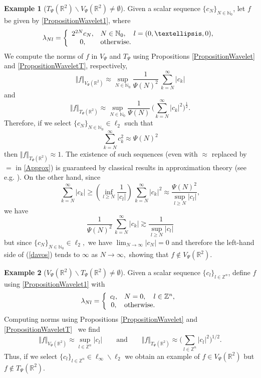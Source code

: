 \documentclass[11pt, a4paper,leqno]{amsart}
\theoremstyle{plain}
\numberwithin{equation}{section}
\theoremstyle{definition}
\newtheorem{example}{Example}
\theoremstyle{remark}
\begin{document}
\begin{example}[$T_{\Psi}(\mathbb{R}^{2})\backslash V_{\Psi}(\mathbb{R}%
^{2})\neq\emptyset$]
\label{Section5.1} Given a scalar sequence $\{c_{N}\}_{N\in\mathbb{N}_{0}}$,
let $f$ be given by \eqref{PropositionWavelet1}, where
\[
\lambda_{N l}=\left\{
\begin{array}
[c]{cl}%
2^{2N}c_{N}, & N\in\mathbb{N}_{0},\quad l=(0,\ldots,0),\\
0, & \text{otherwise}.
\end{array}
\right.
\]
We compute the norms of $f$ in $V_{\Psi}$ and $T_{\Psi}$ using Propositions
\ref{PropositionWavelet} and \ref{PropositionWaveletT}, respectively,
\[
\Vert f\Vert_{V_{\Psi}(\mathbb{R}^{2})}\approx\sup_{N\in\mathbb{N}_{0}}%
\frac{1}{\Psi(N)^{2}}\,\sum_{k=N}^{\infty}|c_{k}|
\]
and
\[
\Vert f\Vert_{T_{\Psi}(\mathbb{R}^{2})}\approx\sup_{N\in\mathbb{N}_{0}}%
\frac{1}{\Psi(N)}\,\bigg(\sum_{k=N}^{\infty}|c_{k}|^{2}\bigg)^{\frac{1}{2}}.
\]
Therefore, if we select $\{c_{N}\}_{N\in\mathbb{N}_{0}}\in\ell_{2}$ such
that
\begin{equation}
\sum_{k=N}^{\infty}c_{k}^{2}\approx\Psi(N)^{2} \label{Approx}%
\end{equation}
then $\Vert f\Vert_{T_{\Psi}(\mathbb{R}^{2})}\approx1.$ The existence of such
sequences (even with $\approx$ replaced by $=$ in \eqref{Approx}) is
guaranteed by classical results in approximation theory (see e.g. \cite[Section 2.5]{Timan}). On the other hand, since
\[
\sum_{k=N}^{\infty}|c_{k}| \geq\left(  \inf_{l\geq N}\frac{1}{|c_{l}|}\right)  \,\sum_{k=N}^{\infty
}|c_{k}|^{2}\approx\frac{\Psi(N)^{2}}{\sup_{l\geq N}|c_{l}|},
\]
we have%
\begin{equation}
\frac{1}{\Psi(N)^{2}}\,\sum_{k=N}^{\infty}|c_{k}|\gtrsim\frac{1}{\sup_{l\geq
N}|c_{l}|} \label{davos}%
\end{equation}
but since $\{c_{N}\}_{N\in\mathbb{N}_{0}}\in\ell_{2},$ we have $\lim
_{N\rightarrow\infty}|c_{N}|=0$ and therefore the left-hand side of
(\ref{davos}) tends to $\infty$ as $N\rightarrow\infty,$ showing that
$f\not \in V_{\Psi}(\mathbb{R}^{2})$.
\end{example}

\begin{example}[$V_{\Psi}(\mathbb{R}^{2})\backslash T_{\Psi}(\mathbb{R}%
^{2}) \neq \emptyset$]
\label{Section5.2}  Given a scalar sequence $\{c_{l}\}_{l\in\mathbb{Z}^{n}}$, define $f$
using \eqref{PropositionWavelet1} with
\[
\lambda_{N l}=\left\{
\begin{array}
[c]{cl}%
c_{l}, & N=0,\quad l\in\mathbb{Z}^{n},\\
0, & \text{otherwise}.
\end{array}
\right.
\]
Computing norms using Propositions \ref{PropositionWavelet} and
\ref{PropositionWaveletT} \ we find
\[
\Vert f\Vert_{V_{\Psi}(\mathbb{R}^{2})}\approx\sup_{l\in\mathbb{Z}^{n}}%
|c_{l}| \qquad \text{and} \qquad \Vert f\Vert_{T_{\Psi}(\mathbb{R}^{2})}\approx\bigg(\sum_{l\in\mathbb{Z}^{n}%
}|c_{l}|^{2}\bigg)^{1/2}.
\]
Thus, if we select $\{c_{l}\}_{l\in\mathbb{Z}^{n}}\in\ell_{\infty}%
\backslash\ell_{2}$ we obtain an example of $f\in V_{\Psi}(\mathbb{R}^{2})$
but $f\not \in T_{\Psi}(\mathbb{R}^{2})$.
\end{example}
\end{document}
